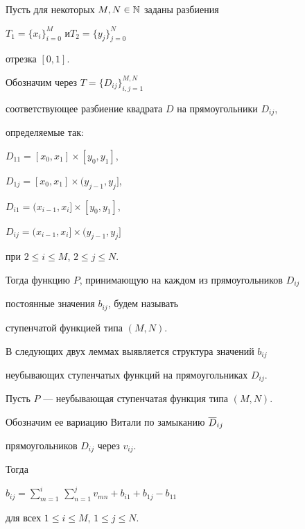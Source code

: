 \begin{defn}


Пусть для некоторых $M, N\in {\Bbb N}$ заданы разбиения


$T_1=\{x_i\}_{i=0}^{M}$ и\linebreak $T_2=\{y_j\}_{j=0}^{N}$


отрезка $[0,1]$.


Обозначим через $T=\{D_{ij}\}_{i,j=1}^{M,N}$


соответствующее разбиение квадрата $D$ на прямоугольники $D_{ij}$,


определяемые так:


$D_{11}=[x_0,x_1]\times[y_0, y_1]$,


$D_{1j}=[x_0,x_1]\times (y_{j-1}, y_j]$,


$D_{i1}=(x_{i-1},x_i]\times[y_0, y_1]$,


$D_{ij}=(x_{i-1},x_i]\times (y_{j-1}, y_j]$


при $2 \leqslant i\leqslant M$, $2\leqslant j\leqslant N$.


Тогда функцию $P$, принимающую на каждом из прямоугольников $D_{ij}$


постоянные значения $b_{ij}$, будем называть


ступенчатой функцией типа $(M,N)$.


\end{defn}





В следующих двух леммах выявляется структура значений $b_{ij}$


неубывающих ступенчатых функций на прямоугольниках $D_{ij}$.





\begin{lem}


Пусть $P$ --- неубывающая ступенчатая функция типа $(M,N)$.


Обозначим ее вариацию Витали по замыканию $\overline D_{ij}$


прямоугольников $D_{ij}$ через $v_{ij}$.


Тогда


$b_{ij}= \sum\limits_{m=1}^{i}\, \sum\limits_{n=1}^{j}


v_{mn} +b_{i1}+b_{1j}-b_{11}$


для всех $1 \leqslant i\leqslant M$, $1\leqslant j\leqslant N$.


\end{lem}





